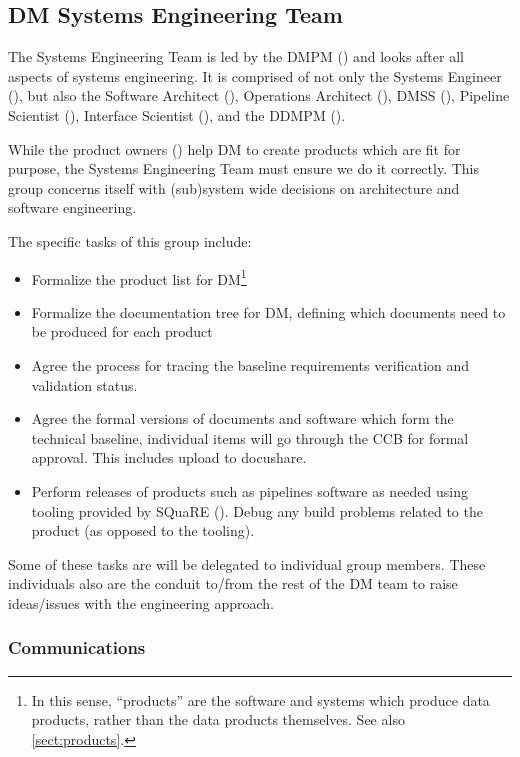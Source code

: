 \subsection{DM Systems Engineering Team \label{sect:sysengt}}

The Systems Engineering Team is led by the DMPM () and looks after all aspects of systems engineering.
It is comprised of not only the Systems Engineer (), but also the Software Architect (), Operations Architect (), \gls{DMSS} (), Pipeline Scientist (), Interface Scientist (), and the \gls{DDMPM} ().

While the product owners () help DM to create products which are fit for purpose, the Systems Engineering Team must ensure we do it correctly. This group concerns itself with (sub)system wide decisions on architecture and software engineering.

The specific tasks of this group include:

\begin{itemize}
\item Formalize the product list for DM\footnote{In this sense, ``products'' are the software and systems which produce data products, rather than the data products themselves. See also \ref{sect:products}.}
\item Formalize the documentation tree for DM, defining which documents need to be produced for each product
\item Agree the process for tracing the baseline requirements verification and validation status.
\item Agree the formal versions of documents and software which form the technical baseline, individual items will go through the CCB for formal approval.  This includes upload to docushare.
\item Perform releases of products such as pipelines software as needed using tooling provided by SQuaRE (). Debug any build problems related to the product (as opposed to the tooling).
\end{itemize}

Some of these tasks are will be delegated to individual group members.
These individuals also are the conduit to/from the rest of the DM team to raise ideas/issues with the engineering approach.

\subsubsection{Communications}

